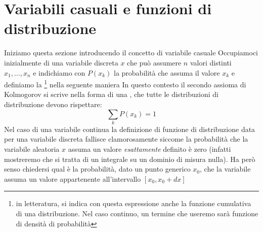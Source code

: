 \documentclass{report}
\begin{document}
\section{Variabili casuali e funzioni di distribuzione}
Iniziamo questa sezione introducendo il concetto di variabile casuale
\noindent Occupiamoci inizialmente di una variabile discreta $x$ che può assumere $n$ valori distinti $x_1, \dots, x_n$ e indichiamo con $P(x_k)$ la probabilità che assuma il valore $x_k$ e definiamo la \footnote{in letteratura, si indica con questa espressione anche la funzione cumulativa di una distribuzione. Nel caso continuo, un termine che useremo sarà funzione di densità di probabilità} nella seguente maniera
In questo contesto il secondo assioma di Kolmogorov si scrive nella forma di una \emph{}, che tutte le distribuzioni di distribuzione devono rispettare:
$$
	\sum_k P(x_k) = 1
$$
Nel caso di una variabile continua la definizione di funzione di distribuzione data per una variabile discreta fallisce clamorosamente siccome la probabilità che la variabile aleatoria $x$ assuma un valore \emph{esattamente} definito è zero (infatti mostreremo che si tratta di un integrale su un dominio di misura nulla). Ha però senso chiedersi qual è la probabilità, dato un punto generico $x_0$, che la variabile assuma un valore appartenente all'intervallo $[x_0, x_0 + dx]$
\end{document}
